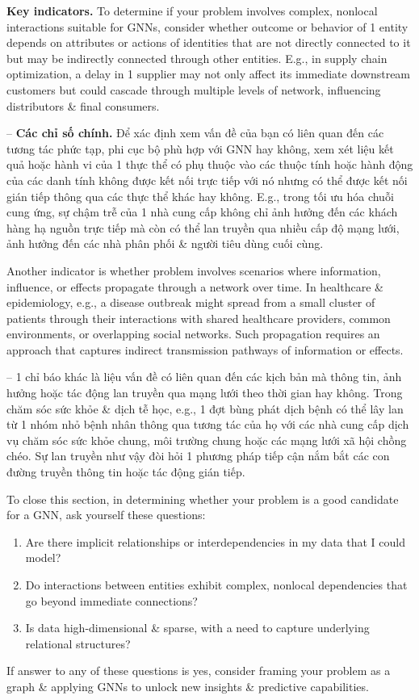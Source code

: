 \documentclass{article}
\begin{document}
\begin{itemize}
\begin{itemize}
\begin{itemize}
            {\bf Key indicators.} To determine if your problem involves complex, nonlocal interactions suitable for GNNs, consider whether outcome or behavior of 1 entity depends on attributes or actions of identities that are not directly connected to it but may be indirectly connected through other entities. E.g., in supply chain optimization, a delay in 1 supplier may not only affect its immediate downstream customers but could cascade through multiple levels of network, influencing distributors \& final consumers.

            -- {\bf Các chỉ số chính.} Để xác định xem vấn đề của bạn có liên quan đến các tương tác phức tạp, phi cục bộ phù hợp với GNN hay không, xem xét liệu kết quả hoặc hành vi của 1 thực thể có phụ thuộc vào các thuộc tính hoặc hành động của các danh tính không được kết nối trực tiếp với nó nhưng có thể được kết nối gián tiếp thông qua các thực thể khác hay không. E.g., trong tối ưu hóa chuỗi cung ứng, sự chậm trễ của 1 nhà cung cấp không chỉ ảnh hưởng đến các khách hàng hạ nguồn trực tiếp mà còn có thể lan truyền qua nhiều cấp độ mạng lưới, ảnh hưởng đến các nhà phân phối \& người tiêu dùng cuối cùng.

            Another indicator is whether problem involves scenarios where information, influence, or effects propagate through a network over time. In healthcare \& epidemiology, e.g., a disease outbreak might spread from a small cluster of patients through their interactions with shared healthcare providers, common environments, or overlapping social networks. Such propagation requires an approach that captures indirect transmission pathways of information or effects.

            -- 1 chỉ báo khác là liệu vấn đề có liên quan đến các kịch bản mà thông tin, ảnh hưởng hoặc tác động lan truyền qua mạng lưới theo thời gian hay không. Trong chăm sóc sức khỏe \& dịch tễ học, e.g., 1 đợt bùng phát dịch bệnh có thể lây lan từ 1 nhóm nhỏ bệnh nhân thông qua tương tác của họ với các nhà cung cấp dịch vụ chăm sóc sức khỏe chung, môi trường chung hoặc các mạng lưới xã hội chồng chéo. Sự lan truyền như vậy đòi hỏi 1 phương pháp tiếp cận nắm bắt các con đường truyền thông tin hoặc tác động gián tiếp.

            To close this section, in determining whether your problem is a good candidate for a GNN, ask yourself these questions:
            \begin{enumerate}
                \item Are there implicit relationships or interdependencies in my data that I could model?
                \item Do interactions between entities exhibit complex, nonlocal dependencies that go beyond immediate connections?
                \item Is data high-dimensional \& sparse, with a need to capture underlying relational structures?
            \end{enumerate}
            If answer to any of these questions is yes, consider framing your problem as a graph \& applying GNNs to unlock new insights \& predictive capabilities.


\end{itemize}
\end{itemize}
\end{itemize}
\end{document}
